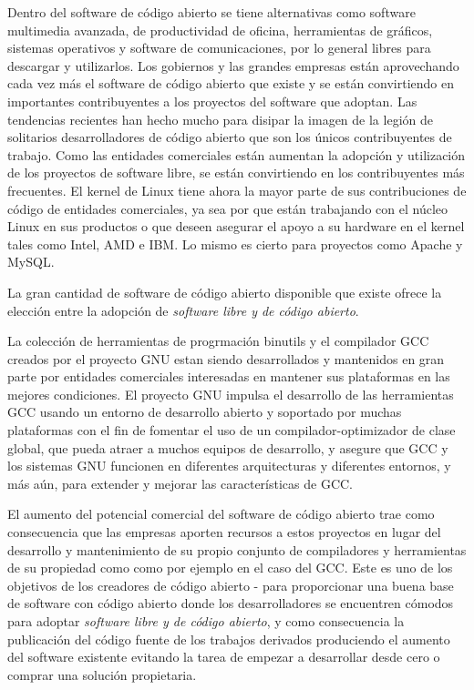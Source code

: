 Dentro del software de código abierto se tiene alternativas como software multimedia avanzada, de productividad de oficina,  herramientas de gráficos, sistemas operativos y software de comunicaciones, por lo general libres para descargar y utilizarlos. Los gobiernos y las grandes empresas están aprovechando cada vez más el software de código abierto que existe y se están convirtiendo en importantes contribuyentes a los proyectos del software que adoptan. Las tendencias recientes han hecho mucho para disipar la imagen de la legión de solitarios desarrolladores de código abierto que son los únicos contribuyentes de trabajo. 
Como las entidades comerciales están aumentan la adopción y utilización de los proyectos de software libre,  se están convirtiendo en los contribuyentes más frecuentes. El kernel de Linux tiene ahora la mayor parte de sus contribuciones de código de entidades comerciales, ya sea por que están trabajando con el núcleo Linux en sus productos o que deseen asegurar el apoyo a su hardware en el kernel tales como Intel, AMD e IBM. Lo mismo es cierto para proyectos como Apache y MySQL.


La gran cantidad de software de código abierto disponible que existe ofrece la elección entre la adopción de \textit{software libre y de código abierto}. 

La colección de herramientas de progrmación binutils y el compilador GCC creados por el proyecto GNU estan siendo desarrollados y mantenidos en gran parte por entidades comerciales interesadas en mantener sus plataformas en las mejores condiciones. El proyecto GNU impulsa el desarrollo de las herramientas GCC usando un entorno de desarrollo abierto y soportado por muchas plataformas con el fin de fomentar el uso de un compilador-optimizador de clase global, que pueda atraer a muchos equipos de desarrollo, y asegure que GCC y los sistemas GNU funcionen en diferentes arquitecturas y diferentes entornos, y más aún, para extender y mejorar las características de GCC. 

El aumento del potencial comercial del software de código abierto trae como consecuencia que las empresas aporten recursos a estos proyectos en lugar del desarrollo y mantenimiento de su propio conjunto de compiladores y herramientas de su propiedad como como por ejemplo en el caso del GCC. Este es uno de los objetivos de los creadores de código abierto - para proporcionar una buena base de software con código abierto donde los desarrolladores se encuentren cómodos para adoptar  \textit{software libre y de código abierto}, y como consecuencia la publicación del código fuente de los trabajos derivados
produciendo el aumento del software existente evitando la tarea de empezar a desarrollar desde cero o comprar una solución propietaria. 

